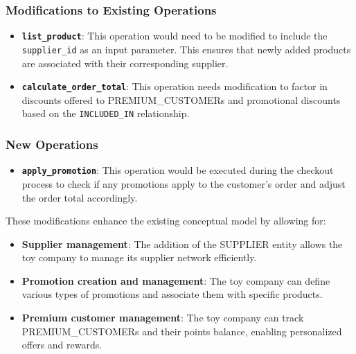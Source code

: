 \documentclass[
]{report}
\providecommand{\tightlist}{%
  \setlength{\itemsep}{0pt}\setlength{\parskip}{0pt}}\usepackage{longtable,booktabs,array}
\begin{document}
\subsubsection{\texorpdfstring{\textbf{Modifications to Existing
Operations}}{Modifications to Existing Operations}}\label{modifications-to-existing-operations}

\begin{itemize}
\item
  \textbf{\texttt{list\_product}}: This operation would need to be
  modified to include the \texttt{supplier\_id} as an input parameter.
  This ensures that newly added products are associated with their
  corresponding supplier.
\item
  \textbf{\texttt{calculate\_order\_total}}: This operation needs
  modification to factor in discounts offered to PREMIUM\_CUSTOMERs and
  promotional discounts based on the \texttt{INCLUDED\_IN} relationship.
\end{itemize}

\subsubsection{\texorpdfstring{\textbf{New
Operations}}{New Operations}}\label{new-operations}

\begin{itemize}
\tightlist
\item
  \textbf{\texttt{apply\_promotion}}: This operation would be executed
  during the checkout process to check if any promotions apply to the
  customer's order and adjust the order total accordingly.
\end{itemize}

These modifications enhance the existing conceptual model by allowing
for:

\begin{itemize}
\tightlist
\item
  \textbf{Supplier management}: The addition of the SUPPLIER entity
  allows the toy company to manage its supplier network efficiently.
\item
  \textbf{Promotion creation and management}: The toy company can define
  various types of promotions and associate them with specific products.
\item
  \textbf{Premium customer management}: The toy company can track
  PREMIUM\_CUSTOMERs and their points balance, enabling personalized
  offers and rewards.
\end{itemize}
\end{document}
